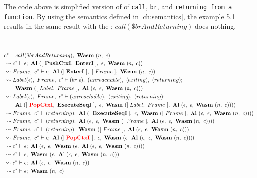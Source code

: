 The code above is simplified version of \spectecp{} of \texttt{call},
\texttt{br}, and \texttt{returning from a function}.
By using the semantics defined in \cref{ch:semantics}, the example 5.1 results
in the same result with the \officialp{}; $call(\$brAndReturning)$ does
nothing.


 \\
\begin{align}
  &c^* \vdash call(\$brAndReturning); ~ \textbf{Wasm} ~ (n, ~ c)
  \label{eq:resolve-1} \\
  &\leadsto c^* \vdash \epsilon; ~ \textbf{Al} ~ ([ ~ \textbf{PushCtxI}, ~ \textbf{EnterI} ~ ], ~ \epsilon, ~ \textbf{Wasm} ~ (n, ~ c))
  \label{eq:resolve-2} \\
  &\leadsto Frame, ~ c^* \vdash \epsilon; ~ \textbf{Al} ~ ([ ~ \textbf{EnterI} ~ ], ~ [ ~ Frame ~ ], ~ \textbf{Wasm} ~ (n, ~ c))
  \label{eq:resolve-3} \\
  &\leadsto Label(\epsilon), ~ Frame, ~ c^* \vdash (br ~ \epsilon), ~ (unreachable), ~ (exiting), ~ (returning); \\
  &\quad\quad \textbf{Wasm} ~ ([ ~ Label, ~ Frame ~ ], ~ \textbf{Al} ~ (\epsilon, ~ \epsilon, ~ \textbf{Wasm} ~ (n, ~ c)))
  \label{eq:resolve-4} \\
  &\leadsto Label(\epsilon), ~ Frame, ~ c^* \vdash (unreachable), ~ (exiting), ~ (returning); \\
  &\quad\quad \textbf{Al} ~ ([ ~ \textcolor{red}{\textbf{PopCtxI}}, ~ \textbf{ExecuteSeqI} ~ ], ~ \epsilon, ~ \textbf{Wasm} ~ ([ ~ Label, ~ Frame ~ ], ~ \textbf{Al} ~ (\epsilon, ~ \epsilon, ~ \textbf{Wasm} ~ (n, ~ c))))
  \label{eq:resolve-5} \\
  &\leadsto Frame, ~ c^* \vdash (returning); ~
    \textbf{Al} ~ ([ ~ \textbf{ExecuteSeqI} ~ ], ~ \epsilon, ~ \textbf{Wasm} ~ ([ ~ Frame ~ ], ~ \textbf{Al} ~ (\epsilon, ~ \epsilon, ~ \textbf{Wasm} ~ (n, ~ c))))
  \label{eq:resolve-6} \\
  &\leadsto Frame, ~ c^* \vdash (returning); ~
    \textbf{Al} ~ (\epsilon, ~ \epsilon, ~ \textbf{Wasm} ~ ([ ~ Frame ~ ], ~ \textbf{Al} ~ (\epsilon, ~ \epsilon, ~ \textbf{Wasm} ~ (n, ~ c))))
  \label{eq:resolve-7} \\
  &\leadsto Frame, ~ c^* \vdash (returning); ~ \textbf{Wasm} ~ ([ ~ Frame ~ ], ~ \textbf{Al} ~ (\epsilon, ~ \epsilon, ~ \textbf{Wasm} ~ (n, ~ c)))
  \label{eq:resolve-8} \\
  &\leadsto Frame, ~ c^* \vdash \epsilon; ~
    \textbf{Al} ~ ([ ~ \textcolor{red}{\textbf{PopCtxI}} ~ ], ~ \epsilon, ~ \textbf{Wasm} ~ (\epsilon, ~ \textbf{Al} ~ (\epsilon, ~ \epsilon, ~ \textbf{Wasm} ~ (n, ~ c))))
  \label{eq:resolve-9} \\
  &\leadsto c^* \vdash \epsilon; ~
    \textbf{Al} ~ (\epsilon, ~ \epsilon, ~ \textbf{Wasm} ~ (\epsilon, ~ \textbf{Al} ~ (\epsilon, ~ \epsilon, ~ \textbf{Wasm} ~ (n, ~ c))))
  \label{eq:resolve-10} \\
  &\leadsto c^* \vdash \epsilon; ~ \textbf{Wasm} ~ (\epsilon, ~ \textbf{Al} ~ (\epsilon, ~ \epsilon, ~ \textbf{Wasm} ~ (n, ~ c)))
  \label{eq:resolve-11} \\
  &\leadsto c^* \vdash \epsilon; ~ \textbf{Al} ~ (\epsilon, ~ \epsilon, ~ \textbf{Wasm} ~ (n, ~ c))
  \label{eq:resolve-12} \\
  &\leadsto c^* \vdash \epsilon; ~ \textbf{Wasm} ~ (n, ~ c)
  \label{eq:resolve-13}
\end{align}
